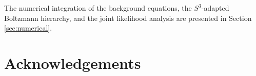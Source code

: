 \documentclass[10pt,twocolumn]{article}
\theoremstyle{definition}
\begin{document}
The numerical integration of the background equations, the \(S^3\)-adapted Boltzmann hierarchy, and the joint likelihood analysis are presented in Section \ref{sec:numerical}.

\section*{Acknowledgements}
\noindent
[To be completed.] 

\newpage


\end{document}
